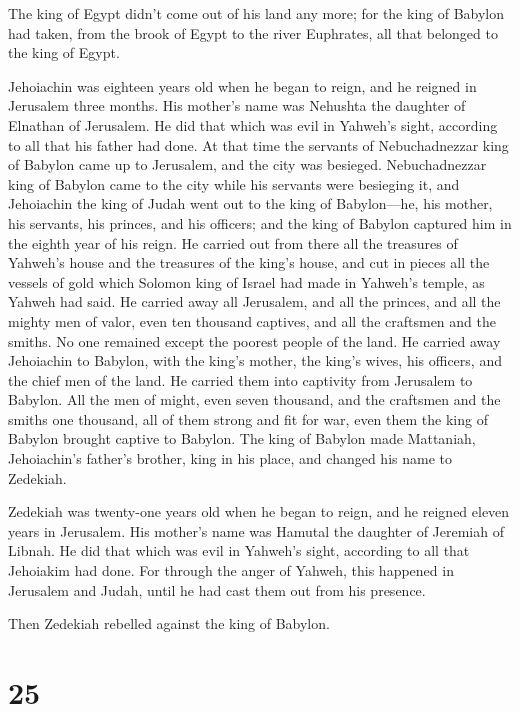  The king of Egypt didn't come out of his land any more;
for the king of Babylon had taken, from the brook of Egypt to the river
Euphrates, all that belonged to the king of Egypt.

 Jehoiachin was eighteen years old when he began to reign,
and he reigned in Jerusalem three months. His mother's name was Nehushta
the daughter of Elnathan of Jerusalem.  He did that which
was evil in Yahweh's sight, according to all that his father had done.
 At that time the servants of Nebuchadnezzar king of
Babylon came up to Jerusalem, and the city was besieged. 
Nebuchadnezzar king of Babylon came to the city while his servants were
besieging it,  and Jehoiachin the king of Judah went out
to the king of Babylon---he, his mother, his servants, his princes, and
his officers; and the king of Babylon captured him in the eighth year of
his reign.  He carried out from there all the treasures
of Yahweh's house and the treasures of the king's house, and cut in
pieces all the vessels of gold which Solomon king of Israel had made in
Yahweh's temple, as Yahweh had said.  He carried away all
Jerusalem, and all the princes, and all the mighty men of valor, even
ten thousand captives, and all the craftsmen and the smiths. No one
remained except the poorest people of the land.  He
carried away Jehoiachin to Babylon, with the king's mother, the king's
wives, his officers, and the chief men of the land. He carried them into
captivity from Jerusalem to Babylon.  All the men of
might, even seven thousand, and the craftsmen and the smiths one
thousand, all of them strong and fit for war, even them the king of
Babylon brought captive to Babylon.  The king of Babylon
made Mattaniah, Jehoiachin's father's brother, king in his place, and
changed his name to Zedekiah.

 Zedekiah was twenty-one years old when he began to
reign, and he reigned eleven years in Jerusalem. His mother's name was
Hamutal the daughter of Jeremiah of Libnah.  He did that
which was evil in Yahweh's sight, according to all that Jehoiakim had
done.  For through the anger of Yahweh, this happened in
Jerusalem and Judah, until he had cast them out from his presence.

Then Zedekiah rebelled against the king of Babylon.

\hypertarget{section-24}{%
\section{25}\label{section-24}}

